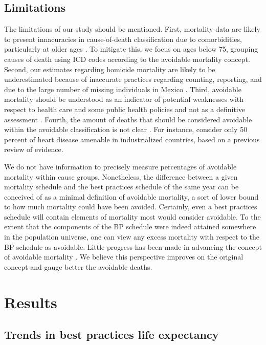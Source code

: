 \documentclass{article}
\begin{document}
\subsection*{Limitations}
The limitations of our study should be mentioned. First, mortality data are
likely to present innacuracies in cause-of-death classification due to
comorbidities, particularly at older ages \citep{tobias2001}. To mitigate this,
we focus on ages below 75, grouping causes of death using ICD codes according to
the avoidable mortality concept.
Second, our estimates regarding homicide mortality are likely to be
underestimated because of inaccurate practices regarding counting, reporting,
and due to the large number of missing individuals in Mexico \citep{HRW2011}.
Third, avoidable mortality should be understood as an indicator of potential
weaknesses with respect to health care and some public health policies and not
as a definitive assessment \citep{nolte&mckee2008}. Fourth, the amount of deaths
that should be considered avoidable within the avoidable classification is not
clear \citep{beltran2011avoidable}. For instance, \citet{nolte2012amenable}
consider only 50 percent of heart disease amenable in industrialized countries,
based on a previous review of evidence.

We do not have information to precisely
measure percentages of avoidable mortality within cause groups. Nonetheless, the
difference between a given mortality schedule and the best practices schedule of
the same year can be conceived of as a minimal definition of avoidable
mortality, a sort of lower bound to how much mortality could have been avoided.
Certainly, even a best practices schedule will contain elements of mortality
most would consider avoidable. To the extent that the components of the BP schedule were indeed
attained somewhere in the population universe, one can view any excess mortality
with respect to the BP schedule as avoidable. Little progress has been made in advancing the concept of avoidable mortality \citep{holland2003}. We believe this perspective improves on the original concept and gauge better the avoidable deaths.

\section*{Results}
\subsection*{Trends in best practices life expectancy}
\end{document}
